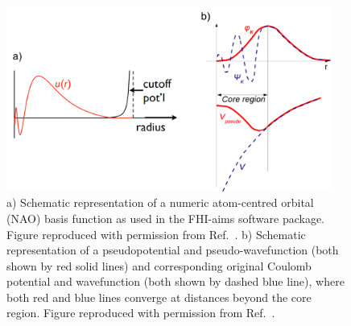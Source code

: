 \documentclass[11pt, twoside]{report}
\begin{document}
\begin{figure}[h!]
  \centering
    \includegraphics[width=0.95\textwidth]{figures/NACBF+PP.png}
    \caption[a) Schematic representation of a numeric atom-centred orbital (NAO) basis function as used in the FHI-aims software package. b) Schematic representation of a pseudopotential and pseudo-wavefunction (both shown by red solid lines) and corresponding original Coulomb potential and wavefunction (both shown by dashed blue line), where both red and blue lines converge at distances beyond the core region.]{a) Schematic representation of a numeric atom-centred orbital (NAO) basis function as used in the FHI-aims software package. Figure reproduced with permission from Ref.~. b) Schematic representation of a pseudopotential and pseudo-wavefunction (both shown by red solid lines) and corresponding original Coulomb potential and wavefunction (both shown by dashed blue line), where both red and blue lines converge at distances beyond the core region. Figure reproduced with permission from Ref.~.}
  \label{NACBF+PP}
\end{figure}
\end{document}
